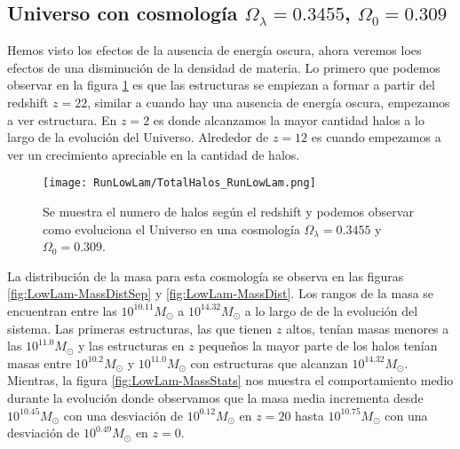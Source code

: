 
\subsection{Universo con cosmología \texorpdfstring{$\Omega_\lambda = 0.3455$, $\Omega_0 = 0.309$ }{Omega lambda = 0.3455, Omega 0 = 0.309}  }

Hemos visto los efectos de la ausencia de energía oscura, ahora veremos loes efectos de una disminución de la densidad de materia. Lo primero que podemos observar en la figura \ref{fig:LowLam_TotalHalos} es que las estructuras se empiezan a formar a partir del redshift $z=22$, similar a cuando hay una ausencia de energía oscura, empezamos a ver estructura. En $z= 2$ es donde alcanzamos la mayor cantidad halos a lo largo de la evolución del Universo. Alrededor de $z = 12$ es cuando empezamos a ver un crecimiento apreciable en la cantidad de halos.

\begin{figure}[H]
    \centering
    \texttt{[image: RunLowLam/TotalHalos\_RunLowLam.png]}
    \caption[Evolución del número de halos en un Universo $\Omega_\lambda = 0.3455$, $\Omega_0 = 0.309$]{\footnotesize Se muestra el numero de halos según el redshift y podemos observar como evoluciona el Universo en una cosmología $\Omega_\lambda = 0.3455 $ y $\Omega_0 = 0.309$.}
    \label{fig:LowLam_TotalHalos}
\end{figure}

La distribución de la masa para esta cosmología se observa en las figuras \ref{fig:LowLam-MassDistSep} y \ref{fig:LowLam-MassDist}. Los rangos de la masa se encuentran entre las $10^{10.11}M_\odot$ a $10^{14.32}M_\odot$ a lo largo de de la evolución del sistema. Las primeras estructuras, las que tienen $z$ altos, tenían masas menores a las $10^{11.0}M_\odot$ y las estructuras en $z$ pequeños la mayor parte de los halos tenían masas entre $10^{10.2}M_\odot$ y $10^{11.0}M_\odot$ con estructuras que alcanzan $10^{14.32}M_\odot$. Mientras, la figura \ref{fig:LowLam-MassStats} nos muestra el comportamiento medio durante la evolución donde observamos que la masa media incrementa desde $10^{10.45}M_\odot$ con una desviación de $10^{0.12}M_\odot$ en $z=20$ hasta $10^{10.75}M_\odot$ con una desviación de $10^{0.49}M_\odot$ en $z=0$.

